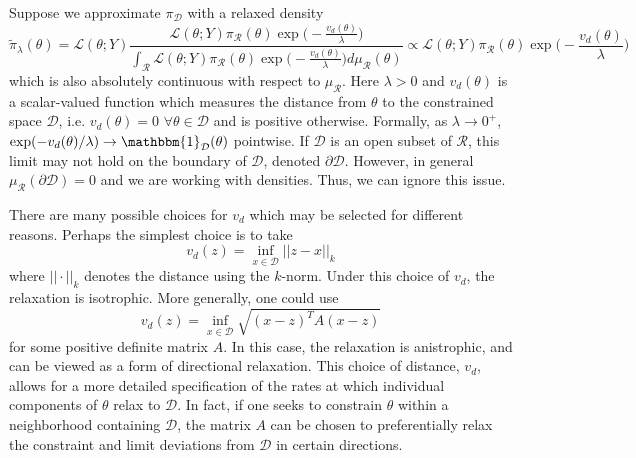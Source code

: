 \documentclass[10pt,fleqn]{article}
\DeclareMathOperator{\1}{\mathbbm{1}}
\begin{document}
Suppose we approximate $\pi_\mathcal{D}$ with a relaxed density $$\tilde{\pi}_\lambda(\theta) = \mathcal{L}(\theta; Y) \frac{\mathcal{L}(\theta; Y)\pi_\mathcal{R}(\theta)\exp\big(-\frac{v_d(\theta)}{\lambda}\big)}{\int_{\mathcal{R}}\mathcal{L}(\theta; Y) \pi_\mathcal{R}(\theta)\exp\big(-\frac{v_d(\theta)}{\lambda}\big) d\mu_\mathcal{R}(\theta)} \propto \mathcal{L}(\theta; Y) \pi_\mathcal{R}(\theta)\exp\big(-\frac{v_d(\theta)}{\lambda}\big)$$
which is also absolutely continuous with respect to $\mu_\mathcal{R}.$
Here $\lambda >0$ and $v_d(\theta)$ is a scalar-valued function which measures the distance from $\theta$ to the constrained space $\mathcal{D}$, i.e. $v_d(\theta) = 0 $ $\forall \theta \in \mathcal{D}$ and is positive otherwise.  Formally, as $\lambda \to 0^+$, $\exp(-v_d(\theta)/\lambda) \to \mathbbm{1}_\mathcal{D}(\theta)$ pointwise.  If $\mathcal{D}$ is an open subset of $\mathcal{R}$, this limit may not hold on the boundary of $\mathcal{D}$, denoted $\partial \mathcal{D}$.  However, in general $\mu_\mathcal{R}(\partial \mathcal{D}) = 0$ and we are working with densities. Thus, we can ignore this issue.

There are many possible choices for $v_d$ which may be selected for different reasons.  Perhaps the simplest choice is to take
\begin{equation}
\label{EQ:Isotrophic_relaxation}
v_d(z) =  \inf_{x\in\mathcal{D}} ||z-x||_k
\end{equation}
where $||\cdot||_k$ denotes the distance using the $k$-norm. Under this choice of $v_d$, the relaxation is isotrophic. More generally, one could use
\begin{equation}
v_d(z) = \inf_{x\in\mathcal{D}} \sqrt{(x-z)^T A (x-z)}\label{EQ:anistrophic_relaxation}
\end{equation} for some positive definite matrix $A$. In this case, the relaxation is anistrophic, and can be viewed as a form of directional relaxation. This choice of distance, $v_d$, allows for a more detailed specification of the rates at which individual components of $\theta$ relax to $\mathcal{D}$.  In fact, if one seeks to constrain $\theta$ within a neighborhood containing $\mathcal{D}$, the matrix $A$ can be chosen to preferentially relax the constraint and limit deviations from $\mathcal{D}$ in certain directions.
\end{document}
